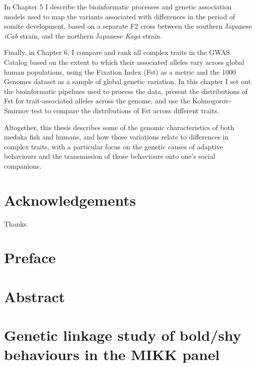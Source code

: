 \documentclass[
]{book}
\begin{document}
In Chapter 5 I describe the bioinformatic processes and genetic association models used to map the variants associated with differences in the period of somite development, based on a separate F2 cross between the southern Japanese \emph{iCab} strain, and the northern Japanese \emph{Kaga} strain.

Finally, in Chapter 6, I compare and rank all complex traits in the GWAS Catalog based on the extent to which their associated alleles vary across global human populations, using the Fixation Index (Fst) as a metric and the 1000 Genomes dataset as a sample of global genetic variation. In this chapter I set out the bioinformatic pipelines used to process the data, present the distributions of Fst for trait-associated alleles across the genome, and use the Kolmogorov-Smirnov test to compare the distributions of Fst across different traits.

Altogether, this thesis describes some of the genomic characteristics of both medaka fish and humans, and how those variations relate to differences in complex traits, with a particular focus on the genetic causes of adaptive behaviours and the transmission of those behaviours onto one's social companions.

\hypertarget{acknowledgements}{%
\chapter*{Acknowledgements}\label{acknowledgements}}

Thanks.

\hypertarget{preface}{%
\chapter*{Preface}\label{preface}}

\hypertarget{abstract}{%
\chapter*{Abstract}\label{abstract}}

\hypertarget{MIKK-F2-chap}{%
\chapter{Genetic linkage study of bold/shy behaviours in the MIKK panel}\label{MIKK-F2-chap}}

\end{document}
